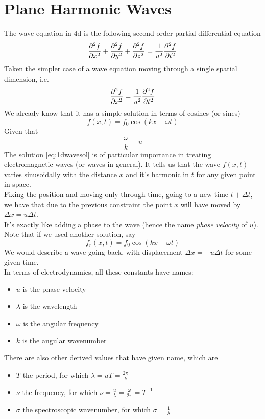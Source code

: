 \documentclass[../electromagnetism.tex]{subfiles}
\begin{document}
\section{Plane Harmonic Waves}
The wave equation in 4d is the following second order partial differential equation
\begin{equation}
	\pdv[2]{f}{x}+\pdv[2]{f}{y}+\pdv[2]{f}{z}=\frac{1}{u^2}\pdv[2]{f}{t}
	\label{eq:3dwaveeq}
\end{equation}
Taken the simpler case of a wave equation moving through a single spatial dimension, i.e.
\begin{equation*}
	\pdv[2]{f}{x}=\frac{1}{u^2}\pdv[2]{f}{t}
\end{equation*}
We already know that it has a simple solution in terms of cosines (or sines)
\begin{equation}
	f(x,t)=f_0\cos(kx-\omega t)
	\label{eq:1dwavesol}
\end{equation}
Given that
\begin{equation*}
	\frac{\omega}{k}=u
\end{equation*}
The solution \eqref{eq:1dwavesol} is of particular importance in treating electromagnetic waves (or waves in general). It tells us that the wave $f(x,t)$ varies sinusoidally with the distance $x$ and it's harmonic in $t$ for any given point in space.\\
Fixing the position and moving only through time, going to a new time $t+\Delta t$, we have that due to the previous constraint the point $x$ will have moved by $\Delta x=u\Delta t$.\\
It's exactly like adding a phase to the wave (hence the name \textit{phase velocity} of $u$). Note that if we used another solution, say
\begin{equation*}
	f_r(x,t)=f_0\cos(kx+\omega t)
\end{equation*}
We would describe a wave going back, with displacement $\Delta x=-u\Delta t$ for some given time.\\
In terms of electrodynamics, all these constants have names:
\begin{itemize}
\item $u$ is the phase velocity
\item $\lambda$ is the wavelength
\item $\omega$ is the angular frequency
\item $k$ is the angular wavenumber
\end{itemize}
There are also other derived values that have given name, which are
\begin{itemize}
\item $T$ the period, for which $\lambda=uT=\frac{2\pi}{k}$
\item $\nu$ the frequency, for which $\nu=\frac{u}{\lambda}=\frac{\omega}{2\pi}=T^{-1}$
\item $\sigma$ the spectroscopic wavenumber, for which $\sigma=\frac{1}{\lambda}$
\end{itemize}
\end{document}
